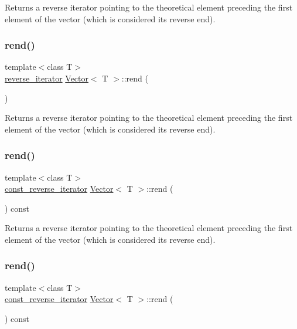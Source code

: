 Returns a reverse iterator pointing to the theoretical element preceding the first element of the vector (which is considered its reverse end). \mbox{\label{classVector_a74380623d29305cf5c9a544756672ef5}} 
\subsubsection{\texorpdfstring{rend()}{rend()}\hspace{0.1cm}{\footnotesize\ttfamily [2/4]}}
{\footnotesize\ttfamily template$<$class T$>$ \\
\hyperlink{classVector_a6afe8339bd8b2187c173c0f46bbd7d63}{reverse\+\_\+iterator} \hyperlink{classVector}{Vector}$<$ T $>$\+::rend (\begin{DoxyParamCaption}{ }\end{DoxyParamCaption})\hspace{0.3cm}{\ttfamily [inline]}}

Returns a reverse iterator pointing to the theoretical element preceding the first element of the vector (which is considered its reverse end). \mbox{\label{classVector_a2749110ca7d7260fac6a1725e7fcbed1}} 
\subsubsection{\texorpdfstring{rend()}{rend()}\hspace{0.1cm}{\footnotesize\ttfamily [3/4]}}
{\footnotesize\ttfamily template$<$class T$>$ \\
\hyperlink{classVector_a963c193ac2399eed1cf20d74f559ef2a}{const\+\_\+reverse\+\_\+iterator} \hyperlink{classVector}{Vector}$<$ T $>$\+::rend (\begin{DoxyParamCaption}{ }\end{DoxyParamCaption}) const\hspace{0.3cm}{\ttfamily [inline]}}

Returns a reverse iterator pointing to the theoretical element preceding the first element of the vector (which is considered its reverse end). \mbox{\label{classVector_a2749110ca7d7260fac6a1725e7fcbed1}} 
\subsubsection{\texorpdfstring{rend()}{rend()}\hspace{0.1cm}{\footnotesize\ttfamily [4/4]}}
{\footnotesize\ttfamily template$<$class T$>$ \\
\hyperlink{classVector_a963c193ac2399eed1cf20d74f559ef2a}{const\+\_\+reverse\+\_\+iterator} \hyperlink{classVector}{Vector}$<$ T $>$\+::rend (\begin{DoxyParamCaption}{ }\end{DoxyParamCaption}) const\hspace{0.3cm}{\ttfamily [inline]}}

